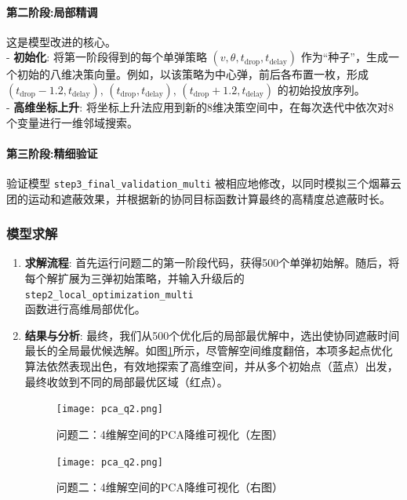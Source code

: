 \documentclass[12pt]{article}
\newcommand{\code}[1]{\texttt{#1}} %
\begin{document}
\begin{CJK}{UTF8}{gbsn}
		\paragraph{第二阶段:局部精调} 这是模型改进的核心。\\
		\indent - \textbf{初始化}: 将第一阶段得到的每个单弹策略 $(v, \theta, t_{\text{drop}}, t_{\text{delay}})$ 作为“种子”，生成一个初始的八维决策向量。例如，以该策略为中心弹，前后各布置一枚，形成 $(t_{\text{drop}}-1.2, t_{\text{delay}})$, $(t_{\text{drop}}, t_{\text{delay}})$, $(t_{\text{drop}}+1.2, t_{\text{delay}})$ 的初始投放序列。\\
		\indent - \textbf{高维坐标上升}: 将坐标上升法应用到新的8维决策空间中，在每次迭代中依次对8个变量进行一维邻域搜索。
		
		\paragraph{第三阶段:精细验证} 验证模型 \code{step3\_final\_validation\_multi} 被相应地修改，以同时模拟三个烟幕云团的运动和遮蔽效果，并根据新的协同目标函数计算最终的高精度总遮蔽时长。
		
		
		\subsubsection{模型求解}
		\begin{enumerate}
			\item \textbf{求解流程}: 首先运行问题二的第一阶段代码，获得500个单弹初始解。随后，将每个解扩展为三弹初始策略，并输入升级后的\code{step2\_local\_optimization\_multi}\\函数进行高维局部优化。
			
			\item \textbf{结果与分析}: 最终，我们从500个优化后的局部最优解中，选出使协同遮蔽时间最长的全局最优候选解。如图\ref{fig:3}所示，尽管解空间维度翻倍，本项多起点优化算法依然表现出色，有效地探索了高维空间，并从多个初始点（蓝点）出发，最终收敛到不同的局部最优区域（红点）。
			
			\begin{figure}[H]
				\centering
				\begin{minipage}{0.48\textwidth}
					\centering
					\texttt{[image: pca\_q2.png]} %
					\caption{问题二：4维解空间的PCA降维可视化（左图）}
					\label{fig:4}
				\end{minipage}
				\hfill %
				\begin{minipage}{0.48\textwidth}
					\centering
					\texttt{[image: pca\_q2.png]} %
					\caption{问题二：4维解空间的PCA降维可视化（右图）}
					\label{fig:3}
				\end{minipage}
			\end{figure}
			

\end{enumerate}
\end{CJK}
\end{document}
